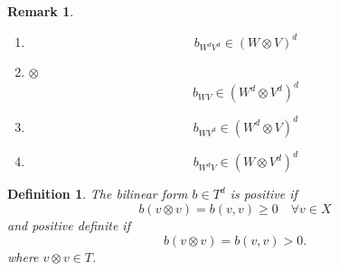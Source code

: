\documentclass[aps,preprint]{revtex4}%
\newtheorem{definition}[theorem]{Definition}
\newtheorem{remark}[theorem]{Remark}
\begin{document}
\begin{remark}


\begin{enumerate}
\item
\begin{equation}
b_{W^{d}V^{d}}\in\left(  W\otimes V\right)  ^{d}%
\end{equation}


\item $\otimes$%
\begin{equation}
b_{WV}\in\left(  W^{d}\otimes V^{d}\right)  ^{d}%
\end{equation}


\item
\begin{equation}
b_{WV^{d}}\in\left(  W^{d}\otimes V\right)  ^{d}%
\end{equation}


\item
\begin{equation}
b_{W^{d}V}\in\left(  W\otimes V^{d}\right)  ^{d}%
\end{equation}

\end{enumerate}
\end{remark}

\begin{definition}
The bilinear form $b\in T^{d}$ is positive if
\begin{equation}
b\left(  v\otimes v\right)  =b\left(  v,v\right)  \geq0\quad\forall v\in X
\end{equation}
and positive definite if
\begin{equation}
b\left(  v\otimes v\right)  =b\left(  v,v\right)  >0.
\end{equation}
where $v\otimes v\in T$. 
\end{definition}
\end{document}
